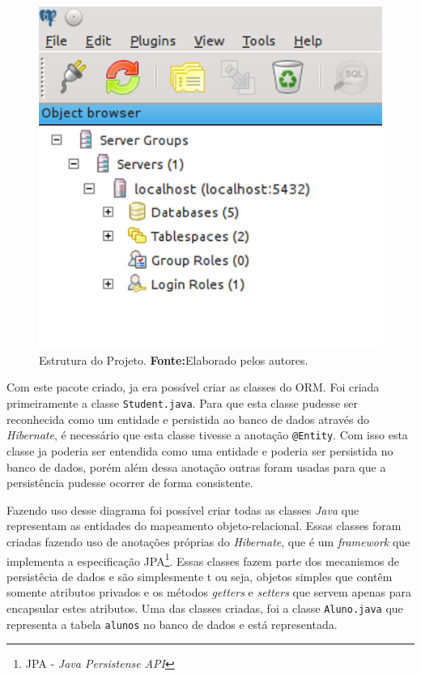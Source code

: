 \begin{figure}[h!]
	\centerline{\includegraphics[scale=0.8]{./imagens/2_q_metodologico/4_procedimentos_resultados/43_webservice/432_desenvolvimento/desws.png}}
	\caption[Estrutura do Projeto]{Estrutura do Projeto.
		\textbf{Fonte:}Elaborado pelos autores.}
	\label{fig:desws1}
\end{figure}
		
	\par Com este pacote criado, ja era possível criar as classes do ORM. Foi
criada primeiramente a classe \texttt{Student.java}. Para que esta classe
pudesse ser reconhecida como um entidade e persistida ao banco de dados através
do \textit{Hibernate}, é necessário que esta classe tivesse a anotação
\texttt{@Entity}. Com isso esta classe ja poderia ser entendida como uma
entidade e poderia ser persistida no banco de dados, porém além dessa anotação
outras foram usadas para que a persistência pudesse ocorrer de forma
consistente.





	
	
			
	
		\par Fazendo uso desse diagrama foi possível criar todas as classes 
	\textit{Java} que representam as entidades do mapeamento objeto-relacional. 
	Essas classes foram criadas fazendo uso de anotações próprias do
	\textit{Hibernate}, que é um \textit{framework} que implementa a especificação
	JPA\footnote{JPA - \textit{Java Persistense API}}. Essas classes fazem parte
	dos mecanismos de persistêcia de dados e são simplesmente t ou seja, objetos
	simples que contêm somente atributos privados e os métodos \textit{getters} e
	\textit{setters} que servem apenas para encapsular estes atributos. Uma das
	classes criadas, foi a classe \texttt{Aluno.java} que representa a tabela
	\texttt{alunos} no banco de dados e está representada.
		
